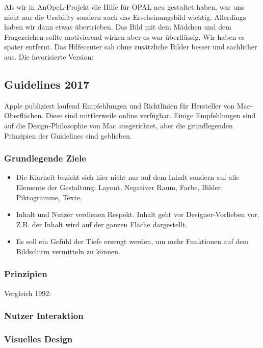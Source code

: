 Als wir in AnOpeL-Projekt die Hilfe für OPAL neu gestaltet haben, war uns nicht nur die Usability sondern auch das Erscheinungsbild wichtig. Allerdings haben wir dann etwas übertrieben. Das Bild mit dem Mädchen und dem Fragezeichen sollte motivierend wirken aber es war überflüssig. Wir haben es später entfernt. Das Hilfecenter sah ohne zusätzliche Bilder besser und sachlicher aus.
Die favorisierte Version:
\subsection{Guidelines 2017}
Apple publiziert laufend Empfehlungen und Richtlinien für Hersteller von Mac-Oberflächen. Diese sind mittlerweile online verfügbar.
Einige Empfehlungen sind auf die Design-Philosophie von Mac ausgerichtet, aber die grundlegenden Prinzipien der Guidelines sind geblieben.
\subsubsection{Grundlegende Ziele}
\begin{itemize}
\item Die Klarheit bezieht sich hier nicht nur auf dem Inhalt sondern auf alle Elemente der Gestaltung: Layout, Negativer Raum, Farbe, Bilder, Piktogramme, Texte. 
\item Inhalt und Nutzer verdienen Respekt. Inhalt geht vor Designer-Vorlieben vor. Z.B. der Inhalt wird auf der ganzen Fläche dargestellt.
\item Es soll ein Gefühl der Tiefe erzeugt werden, um mehr Funktionen auf dem Bildschirm vermitteln zu können.
\end{itemize}

\subsubsection{Prinzipien}
Vergleich 1992:

\subsubsection{Nutzer Interaktion}

\subsubsection{Visuelles Design}


